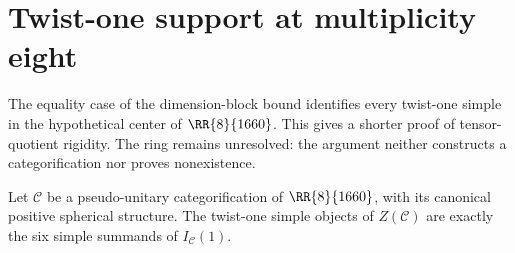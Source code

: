 \section{Twist-one support at multiplicity eight}
\label{subsec:1660-twist-one-support}

The equality case of the dimension-block bound identifies every twist-one
simple in the hypothetical center of $\RR{8}{1660}$. This gives a
shorter proof of tensor-quotient rigidity. The ring remains unresolved: the
argument neither constructs a categorification nor proves nonexistence.

\begin{proposition}\label{prop:1660-twist-one-support}
Let $\mathcal C$ be a pseudo-unitary categorification of $\RR{8}{1660}$,
with its canonical positive spherical structure. The twist-one simple
objects of $Z(\mathcal C)$ are exactly the six simple summands of
$I_{\mathcal C}(1)$.
\end{proposition}
